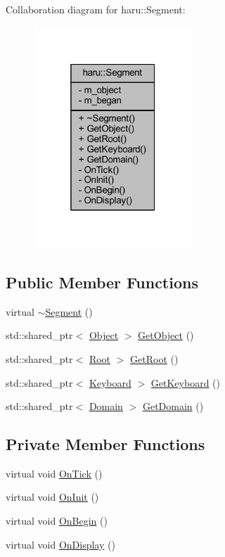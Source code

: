 Collaboration diagram for haru\+:\+:Segment\+:\nopagebreak
\begin{figure}[H]
\begin{center}
\leavevmode
\includegraphics[width=169pt]{classharu_1_1_segment__coll__graph}
\end{center}
\end{figure}
\subsection*{Public Member Functions}
\begin{DoxyCompactItemize}
\item 
virtual \mbox{\hyperlink{classharu_1_1_segment_ac21fa3784567cb3c94280c40f4c006ba}{$\sim$\+Segment}} ()
\item 
std\+::shared\+\_\+ptr$<$ \mbox{\hyperlink{classharu_1_1_object}{Object}} $>$ \mbox{\hyperlink{classharu_1_1_segment_ae4262d0dbfca541db24d43e8925e9d8a}{Get\+Object}} ()
\item 
std\+::shared\+\_\+ptr$<$ \mbox{\hyperlink{classharu_1_1_root}{Root}} $>$ \mbox{\hyperlink{classharu_1_1_segment_adf664884cf9c2b20fc3c8b6944f1ff63}{Get\+Root}} ()
\item 
std\+::shared\+\_\+ptr$<$ \mbox{\hyperlink{class_keyboard}{Keyboard}} $>$ \mbox{\hyperlink{classharu_1_1_segment_ad33423dcc7119727b1fd2cd2a70ecdbf}{Get\+Keyboard}} ()
\item 
std\+::shared\+\_\+ptr$<$ \mbox{\hyperlink{class_domain}{Domain}} $>$ \mbox{\hyperlink{classharu_1_1_segment_ab00d15d78e1d3ae9f3199fd90ef52dcb}{Get\+Domain}} ()
\end{DoxyCompactItemize}
\subsection*{Private Member Functions}
\begin{DoxyCompactItemize}
\item 
virtual void \mbox{\hyperlink{classharu_1_1_segment_ad8b0861ccbf13afe613ff07622c1507b}{On\+Tick}} ()
\item 
virtual void \mbox{\hyperlink{classharu_1_1_segment_adc41c8e5769e0057ade94abf669c6dbc}{On\+Init}} ()
\item 
virtual void \mbox{\hyperlink{classharu_1_1_segment_aa628559af83f147fbc9d1aa468918e55}{On\+Begin}} ()
\item 
virtual void \mbox{\hyperlink{classharu_1_1_segment_a5bb0f5cf9aecda465804016d3ed4092c}{On\+Display}} ()
\end{DoxyCompactItemize}
